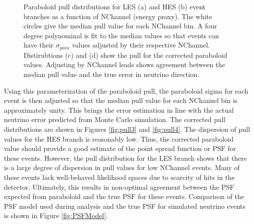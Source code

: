\documentclass{gatech-thesis}
\begin{document}
\begin{figure}
\caption{Paraboloid pull distributions for LES (a) and HES (b) event branches as a function of NChannel (energy proxy). The white circles give the median pull value for each NChannel bin. A four degree polynominal is fit to the median values so that events can have their $\sigma_{para}$ values adjusted by their respective NChannel. Distirubtions (c) and (d) show the pull for the corrected paraboloid values. Adjusting by NChannel leads shows agreement between the median pull value and the true error in neutrino direction.}
\label{fig:ParaboloidPull}
\end{figure}

Using this parameterization of the paraboloid pull, the paraboloid sigma for each event is then adjusted so that the median pull value for each NChannel bin is approximately unity. This brings the error estimation in line with the actual neutrino error predicted from Monte Carlo simulation. The corrected pull distributions are shown in Figures \ref{fig:pull3} and \ref{fig:pull4}. The dispersion of pull values for the HES branch is reasonably low. Thus, the corrected paraboloid value should provide a good estimate of the point spread function or PSF for these events. However, the pull distribution for the LES branch shows that there is a large degree of dispersion in pull values for low NChannel events. Many of these events lack well-behaved likelihood spaces due to scarcity of hits in the detector. Ultimately, this results in non-optimal agreement between the PSF expected from paraboloid and the true PSF for these events. Comparison of the PSF model used during analysis and the true PSF for simulated neutrino events is shown in Figure \ref{fig:PSFModel}.
\end{document}
